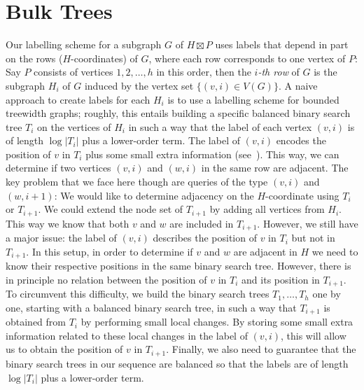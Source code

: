 \documentclass[kpfonts]{patmorin}
\begin{document}


\section{Bulk Trees}

Our labelling scheme for a subgraph $G$ of $H \boxtimes P$ uses labels that depend in part on the rows ($H$-coordinates) of $G$, where each row corresponds to one vertex of $P$: Say $P$ consists of vertices $1, 2, \dots, h$ in this order, then the \emph{$i$-th row} of $G$ is the subgraph $H_i$ of $G$ induced by the vertex set $\{(v, i) \in V(G)\}$.
A naive approach to create labels for each $H_i$ is to use a labelling scheme for bounded treewidth graphs; roughly, this entails building a specific balanced binary search tree $T_i$ on the vertices of $H_i$ in such a way that the label of each vertex $(v, i)$ is of length $\log |T_i|$ plus a lower-order term. The label of $(v, i)$ encodes the position of $v$ in $T_i$ plus some small extra information (see~).
This way, we can determine if two vertices $(v,i)$ and $(w,i)$ in the same row are adjacent.
The key problem that we face here though are queries of the type $(v,i)$ and $(w,i+1)$: We would like to determine adjacency on the $H$-coordinate using $T_i$ or $T_{i+1}$.
We could extend the node set of $T_{i+1}$ by adding all vertices from $H_{i}$. This way we know that both $v$ and $w$ are included in $T_{i+1}$.
However, we still have a major issue: the label of $(v,i)$ describes the position of $v$ in $T_i$ but not in $T_{i+1}$.
In this setup, in order to determine if $v$ and $w$ are adjacent in $H$ we need to know their respective positions in the same binary search tree.
However, there is in principle no relation between the position of $v$ in $T_i$ and its position in $T_{i+1}$.
To circumvent this difficulty, we build the binary search trees $T_1,\ldots,T_h$ one by one, starting with a balanced binary search tree, in such a way that $T_{i+1}$ is obtained from $T_i$ by performing small local changes. By storing some small extra information related to these local changes in the label of $(v,i)$, this will allow us to obtain the position of $v$ in $T_{i+1}$.
Finally, we also need to guarantee that the binary search trees in our sequence are balanced so that the labels are of length $\log|T_i|$ plus a lower-order term.
\end{document}
